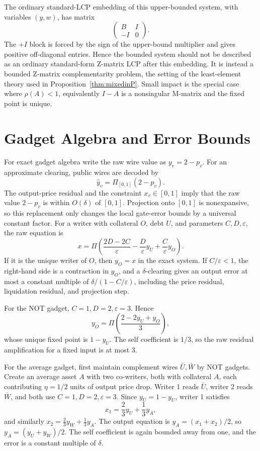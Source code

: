 \documentclass{llncs}
\newcommand{\clip}{\Pi}
\newcommand{\eps}{\varepsilon}
\begin{document}
The ordinary standard-LCP embedding of this upper-bounded system, with variables \((y,w)\), has matrix
\[
    \begin{pmatrix}B&I\\ -I&0\end{pmatrix}.
\]
The \(+I\) block is forced by the sign of the upper-bound multiplier and gives positive off-diagonal entries. Hence the bounded system should not be described as an ordinary standard-form Z-matrix LCP after this embedding. It is instead a bounded Z-matrix complementarity problem, the setting of the least-element theory used in Proposition~\ref{thm:mixedinP}. Small impact is the special case where \(\rho(A)<1\), equivalently \(I-A\) is a nonsingular M-matrix and the fixed point is unique.

\section{Gadget Algebra and Error Bounds}
\label{app:gadget}
For exact gadget algebra write the raw wire value as \(y_v=2-p_v\). For an approximate clearing, public wires are decoded by
\[
        \widehat y_v=\clip_{[0,1]}(2-p_v).
\]
The output-price residual and the constraint \(x_v\in[0,1]\) imply that the raw value \(2-p_v\) is within \(O(\delta)\) of \([0,1]\). Projection onto \([0,1]\) is nonexpansive, so this replacement only changes the local gate-error bounds by a universal constant factor. For a writer with collateral \(O\), debt \(U\), and parameters \(C,D,\eps\), the raw equation is
\[
 x=\clip\left(\frac{2D-2C}{\eps}-\frac{D}{\eps}y_U+\frac{C}{\eps}y_O\right).
\]
If it is the unique writer of \(O\), then \(y_O=x\) in the exact system. If \(C/\eps<1\), the right-hand side is a contraction in \(y_O\), and a \(\delta\)-clearing gives an output error at most a constant multiple of \(\delta/(1-C/\eps)\), including the price residual, liquidation residual, and projection step.

For the NOT gadget, \(C=1,D=2,\eps=3\). Hence
\[
 y_O=\clip\left(\frac{2-2y_U+y_O}{3}\right),
\]
whose unique fixed point is \(1-y_U\). The self coefficient is \(1/3\), so the raw residual amplification for a fixed input is at most \(3\).

For the average gadget, first maintain complement wires \(\bar U,\bar W\) by NOT gadgets. Create an average asset \(A\) with two co-writers, both with collateral \(A\), each contributing \(\eta=1/2\) units of output price drop. Writer 1 reads \(\bar U\), writer 2 reads \(\bar W\), and both use \(C=1,D=2,\eps=3\). Since \(y_{\bar U}=1-y_U\), writer 1 satisfies
\[
 x_1=\frac{2}{3}y_U+\frac{1}{3}y_A,
\]
and similarly \(x_2=\frac{2}{3}y_W+\frac{1}{3}y_A\). The output equation is \(y_A=(x_1+x_2)/2\), so \(y_A=(y_U+y_W)/2\). The self coefficient is again bounded away from one, and the error is a constant multiple of \(\delta\).
\end{document}
